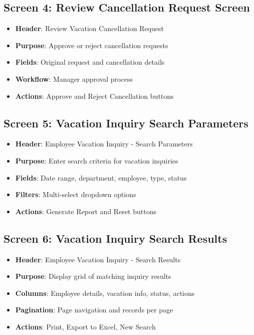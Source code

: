 \documentclass[12pt,a4paper]{article}
\begin{document}
\subsection{Screen 4: Review Cancellation Request Screen}
\begin{itemize}
    \item \textbf{Header}: Review Vacation Cancellation Request
    \item \textbf{Purpose}: Approve or reject cancellation requests
    \item \textbf{Fields}: Original request and cancellation details
    \item \textbf{Workflow}: Manager approval process
    \item \textbf{Actions}: Approve and Reject Cancellation buttons
\end{itemize}

\subsection{Screen 5: Vacation Inquiry Search Parameters}
\begin{itemize}
    \item \textbf{Header}: Employee Vacation Inquiry - Search Parameters
    \item \textbf{Purpose}: Enter search criteria for vacation inquiries
    \item \textbf{Fields}: Date range, department, employee, type, status
    \item \textbf{Filters}: Multi-select dropdown options
    \item \textbf{Actions}: Generate Report and Reset buttons
\end{itemize}

\subsection{Screen 6: Vacation Inquiry Search Results}
\begin{itemize}
    \item \textbf{Header}: Employee Vacation Inquiry - Search Results
    \item \textbf{Purpose}: Display grid of matching inquiry results
    \item \textbf{Columns}: Employee details, vacation info, status, actions
    \item \textbf{Pagination}: Page navigation and records per page
    \item \textbf{Actions}: Print, Export to Excel, New Search
\end{itemize}
\end{document}
